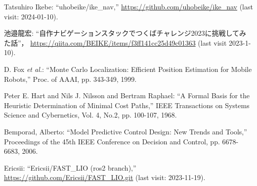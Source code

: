 \documentclass[twocolumn,9pt]{jsproceedings}
\begin{document}
\begin{thebibliography}{99}





  Tatsuhiro Ikebe: ``uhobeike/ike\_nav,'' \url{https://github.com/uhobeike/ike_nav} (last visit: 2024-01-10).

  池邉龍宏: ``自作ナビゲーションスタックでつくばチャレンジ2023に挑戦してみた話''，
  \url{https://qiita.com/BEIKE/items/f3ff141cc25d49c01363} (last visit 2023-1-10).


	  D. Fox {\it et al.}: ``Monte Carlo Localization: Efficient Position Estimation for Mobile Robots,''
  Proc. of AAAI, pp. 343-349, 1999.

  Peter E. Hart and Nils J. Nilsson and Bertram Raphael: ``A Formal Basis for the Heuristic Determination of Minimal Cost Paths,''
  IEEE Transactions on Systems Science and Cybernetics, Vol. 4, No.2, pp. 100-107, 1968.


  Bemporad, Alberto: ``Model Predictive Control Design: New Trends and Tools,''
  Proceedings of the 45th IEEE Conference on Decision and Control, pp. 6678-6683, 2006.

  Ericsii: ``Ericsii/FAST\_LIO (ros2 branch),'' \url{https://github.com/Ericsii/FAST_LIO.git} (last visit: 2023-11-19).


\end{thebibliography}
\end{document}
